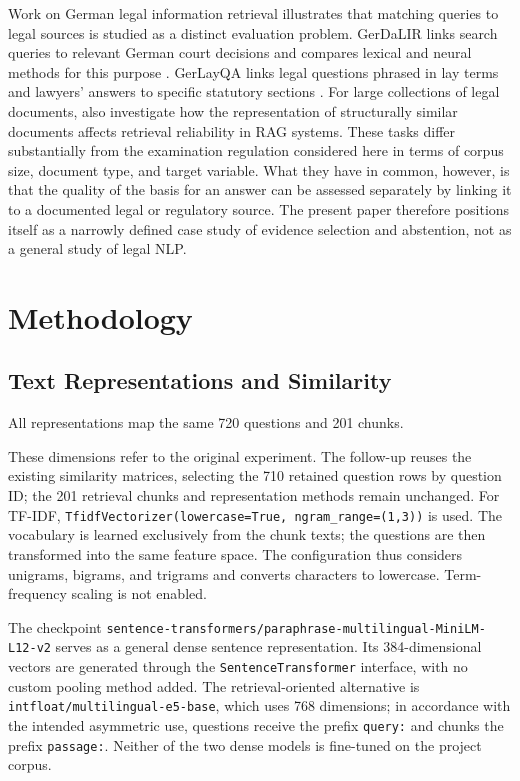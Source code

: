 \documentclass[11pt]{article}
\newcommand{\revision}[1]{{\color{blue}#1}}
\begin{document}
Work on German legal information retrieval illustrates that matching queries to legal sources is studied as a distinct evaluation problem. GerDaLIR links search queries to relevant German court decisions and compares lexical and neural methods for this purpose \citep{wrzalik-krechel-2021-gerdalir}. GerLayQA links legal questions phrased in lay terms and lawyers' answers to specific statutory sections \citep{buttner-habernal-2024-answering}. For large collections of legal documents, \citet{reuter-etal-2025-towards} also investigate how the representation of structurally similar documents affects retrieval reliability in RAG systems. These tasks differ substantially from the examination regulation considered here in terms of corpus size, document type, and target variable. What they have in common, however, is that the quality of the basis for an answer can be assessed separately by linking it to a documented legal or regulatory source. The present paper therefore positions itself as a narrowly defined case study of evidence selection and abstention, not as a general study of legal NLP.


\section{Methodology}

\subsection{Text Representations and Similarity}

All representations map the same 720 questions and 201 chunks.

\revision{These dimensions refer to the original experiment. The follow-up reuses the existing similarity matrices, selecting the 710 retained question rows by question ID; the 201 retrieval chunks and representation methods remain unchanged.} For TF-IDF, \texttt{TfidfVectorizer(lowercase=True, ngram\_range=(1,3))} is used. The vocabulary is learned exclusively from the chunk texts; the questions are then transformed into the same feature space. The configuration thus considers unigrams, bigrams, and trigrams and converts characters to lowercase. Term-frequency scaling is not enabled.

The checkpoint \nolinkurl{sentence-transformers/paraphrase-multilingual-MiniLM-L12-v2} serves as a general dense sentence representation. Its 384-dimensional vectors are generated through the \texttt{SentenceTransformer} interface, with no custom pooling method added. The retrieval-oriented alternative is \texttt{intfloat/multilingual-e5-base}, which uses 768 dimensions; in accordance with the intended asymmetric use, questions receive the prefix \texttt{query:} and chunks the prefix \texttt{passage:}. Neither of the two dense models is fine-tuned on the project corpus.
\end{document}
